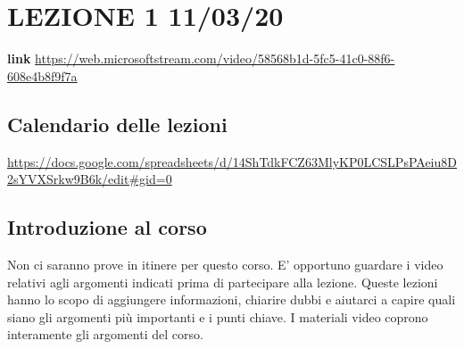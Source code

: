 \section{LEZIONE 1 11/03/20}
\textbf{link} \url{https://web.microsoftstream.com/video/58568b1d-5fc5-41c0-88f6-608e4b8f9f7a}
\subsection{Calendario delle lezioni}
\url{https://docs.google.com/spreadsheets/d/14ShTdkFCZ63MlyKP0LCSLPsPAeiu8D2sYVXSrkw9B6k/edit#gid=0}
\subsection{Introduzione al corso}
Non ci saranno prove in itinere per questo corso.\newline
E' opportuno guardare i video relativi agli argomenti indicati prima di partecipare alla lezione.\newline
Queste lezioni hanno lo scopo di aggiungere informazioni, chiarire dubbi e aiutarci a capire quali siano gli argomenti più importanti e i punti chiave.\newline
I materiali video coprono interamente gli argomenti del corso.
